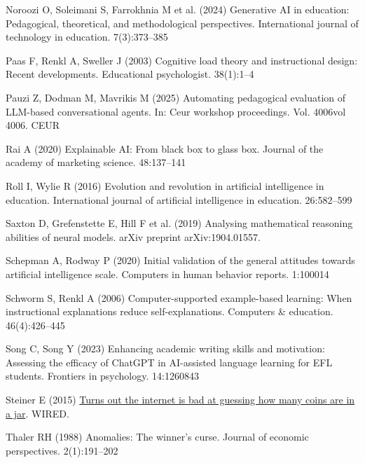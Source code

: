 \documentclass[
  11pt,
]{article}
\newlength{\cslhangindent}
\newenvironment{CSLReferences}[2] %
 {\begin{list}{}{%
  \setlength{\itemindent}{0pt}
  \setlength{\leftmargin}{0pt}
  \setlength{\parsep}{0pt}
  \ifodd #1
   \setlength{\leftmargin}{\cslhangindent}
   \setlength{\itemindent}{-1\cslhangindent}
  \fi
  \setlength{\itemsep}{#2\baselineskip}}}
 {\end{list}}
\begin{document}
\begin{CSLReferences}{1}{0}
Noroozi O, Soleimani S, Farrokhnia M et al. (2024) Generative AI in education: Pedagogical, theoretical, and methodological perspectives. International journal of technology in education. 7(3):373--385

Paas F, Renkl A, Sweller J (2003) Cognitive load theory and instructional design: Recent developments. Educational psychologist. 38(1):1--4

Pauzi Z, Dodman M, Mavrikis M (2025) Automating pedagogical evaluation of LLM-based conversational agents. In: Ceur workshop proceedings. Vol. 4006vol 4006. CEUR

Rai A (2020) Explainable AI: From black box to glass box. Journal of the academy of marketing science. 48:137--141

Roll I, Wylie R (2016) Evolution and revolution in artificial intelligence in education. International journal of artificial intelligence in education. 26:582--599

Saxton D, Grefenstette E, Hill F et al. (2019) Analysing mathematical reasoning abilities of neural models. arXiv preprint arXiv:1904.01557.

Schepman A, Rodway P (2020) Initial validation of the general attitudes towards artificial intelligence scale. Computers in human behavior reports. 1:100014

Schworm S, Renkl A (2006) Computer-supported example-based learning: When instructional explanations reduce self-explanations. Computers \& education. 46(4):426--445

Song C, Song Y (2023) Enhancing academic writing skills and motivation: Assessing the efficacy of ChatGPT in AI-assisted language learning for EFL students. Frontiers in psychology. 14:1260843

Steiner E (2015) \href{https://www.wired.com/2015/01/coin-jar-crowd-wisdom-experiment-results/}{Turns out the internet is bad at guessing how many coins are in a jar}. WIRED.

Thaler RH (1988) Anomalies: The winner's curse. Journal of economic perspectives. 2(1):191--202


\end{CSLReferences}
\end{document}
